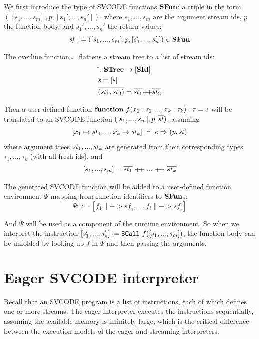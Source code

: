 \def\sf{\mathit{sf}}

We first introduce the type of SVCODE functions $\*{SFun}$: a triple in the form $([s_1,...,s_m], p, [s_1',...,s_n'])$, where $s_1,...,s_m$ are the argument stream ids, $p$ the function body, and $s_1',...,s_n'$ the return values:
$$ \sf ::= ([s_1,...,s_m], p, [s_1',...,s_n']) \in \*{SFun}$$

The overline function $\bar{}$ \ flattens a stream tree to a list of stream ids:
	\begin{align*}
&\bar{}: \STree \-> [\SId] \\
&\overline{\s} = [s] \\
&\overline{(\st_1,st_2)} = \overline{st_1} {\++} \overline{st_2}
\end{align*}

Then a user-defined function $\*{function} \  f(x_1: \tau_1, ..., x_k: \tau_k): \tau = e $ will be translated to an SVCODE function
$([s_1,...,s_m], p, \ol{\st})$, 
assuming
 $$\Trans{[x_1 \|-> st_1,..., x_k \|-> \st_k ]}{e}{}{}{\sfun{p}{\st}}$$ 
where argument trees $\st_1,...,\st_k$  are generated from their corresponding types $\tau_1,...,\tau_k$ (with all fresh ids), and
$$[s_1,...,s_m] = \ol{st_1} \ {\++} \ ... \ {\++} \ \ol{st_k}$$




The generated SVCODE function will be added to a user-defined function environment $\Psi$ mapping from function identifiers to $\*{SFun}$s:
$$ \Psi ::= [f_1 \|-> \sf_1,...,f_i \|-> \sf_i] $$

And $\Psi$ will be used as a component of the runtime environment. So when we interpret the instruction $\scall{f}{[s_1,...,s_m]}{[s_1',...,s_n']}$, the function body can be unfolded by looking up $f$ in $\Psi$ and then passing the arguments.

\section{Eager SVCODE interpreter}
Recall that an SVCODE program is a list of instructions, each of which defines one or more streams. 
The eager interpreter executes the instructions sequentially, assuming the available memory is infinitely large, which is the critical difference between the execution models of the eager and streaming interpreters.

